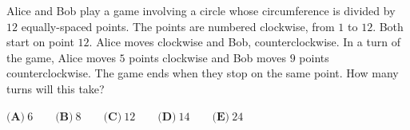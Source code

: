 Alice and Bob play a game involving a circle whose circumference is divided by $12$ equally-spaced points. The points are numbered clockwise, from $1$ to $12$. Both start on point $12$. Alice moves clockwise and Bob, counterclockwise. In a turn of the game, Alice moves $5$ points clockwise and Bob moves $9$ points counterclockwise. The game ends when they stop on the same point. How many turns will this take?

$\textbf{(A)}\ 6\qquad\textbf{(B)}\ 8\qquad\textbf{(C)}\ 12\qquad\textbf{(D)}\ 14\qquad\textbf{(E)}\ 24$
